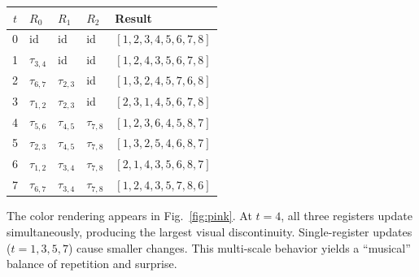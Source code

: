 \documentclass[
  twocolumn,
  aps,
  pra,
  showkeys,
  amsmath,amssymb,
  longbibliography
]{revtex4-2}
\begin{document}
\smallskip
\noindent
\begin{tabular}{@{}cl@{\;}l@{\;}ll@{}}
\toprule
$t$ & $R_0$ & $R_1$ & $R_2$ & Result \\
\midrule
0 & id & id & id & $[1,2,3,4,5,6,7,8]$ \\
1 & $\tau_{3,4}$ & id & id & $[1,2,4,3,5,6,7,8]$ \\
2 & $\tau_{6,7}$ & $\tau_{2,3}$ & id & $[1,3,2,4,5,7,6,8]$ \\
3 & $\tau_{1,2}$ & $\tau_{2,3}$ & id & $[2,3,1,4,5,6,7,8]$ \\
4 & $\tau_{5,6}$ & $\tau_{4,5}$ & $\tau_{7,8}$ & $[1,2,3,6,4,5,8,7]$ \\
5 & $\tau_{2,3}$ & $\tau_{4,5}$ & $\tau_{7,8}$ & $[1,3,2,5,4,6,8,7]$ \\
6 & $\tau_{1,2}$ & $\tau_{3,4}$ & $\tau_{7,8}$ & $[2,1,4,3,5,6,8,7]$ \\
7 & $\tau_{6,7}$ & $\tau_{3,4}$ & $\tau_{7,8}$ & $[1,2,4,3,5,7,8,6]$ \\
\bottomrule
\end{tabular}
\smallskip

\noindent
The color rendering appears in Fig.~\ref{fig:pink}.
At $t=4$, all three registers update simultaneously, producing
the largest visual discontinuity.
Single-register updates ($t=1,3,5,7$) cause smaller changes.
This multi-scale behavior yields a ``musical'' balance of
repetition and surprise.
\end{document}
